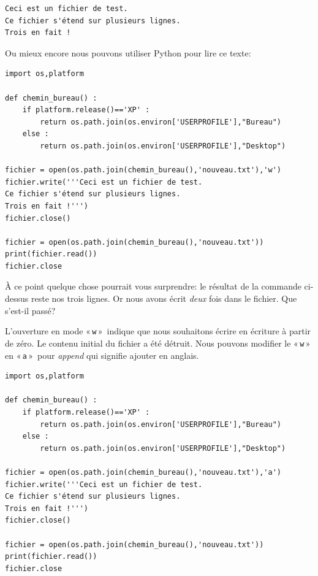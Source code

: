 \begin{Verbatim}[frame=single,rulecolor=\color{gray}, label=contenu de nouveau.txt]
Ceci est un fichier de test.
Ce fichier s'étend sur plusieurs lignes.
Trois en fait !
\end{Verbatim}

Ou mieux encore nous pouvons utiliser Python pour lire ce texte:

\begin{Verbatim}[frame=single,rulecolor=\color{mbleu}, label=à taper par exemple en reprenant l'existant]
import os,platform

def chemin_bureau() :
    if platform.release()=='XP' :
        return os.path.join(os.environ['USERPROFILE'],"Bureau")
    else :
        return os.path.join(os.environ['USERPROFILE'],"Desktop")
    
fichier = open(os.path.join(chemin_bureau(),'nouveau.txt'),'w')
fichier.write('''Ceci est un fichier de test.
Ce fichier s'étend sur plusieurs lignes.
Trois en fait !''')
fichier.close()

fichier = open(os.path.join(chemin_bureau(),'nouveau.txt'))
print(fichier.read())
fichier.close
\end{Verbatim}

À ce point quelque chose pourrait vous surprendre: le résultat de la commande ci-dessus reste nos trois lignes. Or nous avons écrit \emph{deux} fois dans le fichier. Que s'est-il passé?

L'ouverture en mode « \texttt{w} »  indique que nous souhaitons écrire en écriture à partir de zéro. Le contenu initial du fichier a été détruit. Nous pouvons modifier le « \texttt{w} »  en « \texttt{a} »  pour \emph{append} qui signifie ajouter en anglais.

\begin{Verbatim}[frame=single,rulecolor=\color{mbleu}, label=à taper par exemple en reprenant l'existant]
import os,platform

def chemin_bureau() :
    if platform.release()=='XP' :
        return os.path.join(os.environ['USERPROFILE'],"Bureau")
    else :
        return os.path.join(os.environ['USERPROFILE'],"Desktop")
    
fichier = open(os.path.join(chemin_bureau(),'nouveau.txt'),'a')
fichier.write('''Ceci est un fichier de test.
Ce fichier s'étend sur plusieurs lignes.
Trois en fait !''')
fichier.close()

fichier = open(os.path.join(chemin_bureau(),'nouveau.txt'))
print(fichier.read())
fichier.close
\end{Verbatim}

